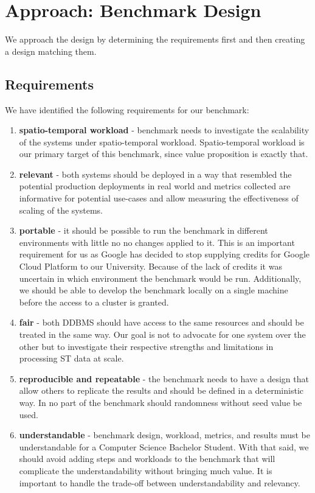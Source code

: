 \section{Approach: Benchmark Design}
\label{cha:benchmarkdesign}

We approach the design by determining the requirements first and then creating a design matching them.

\subsection{Requirements}

We have identified the following requirements for our benchmark:
\begin{enumerate}
	\item \textbf{spatio-temporal workload} \label{req:spatiotemporal-workload}
		- benchmark needs to investigate the scalability of the systems under spatio-temporal workload.
		Spatio-temporal workload is our primary target of this benchmark, since \mobilitydbc value proposition is exactly that.
	\item \textbf{relevant} \label{req:relevant}
		- both systems should be deployed in a way that resembled the potential production deployments in real world and metrics collected are informative for potential use-cases and allow measuring the effectiveness of scaling of the systems.
	\item \textbf{portable} \label{req:portable}
		- it should be possible to run the benchmark in different environments with little no no changes applied to it.
		This is an important requirement for us as Google has decided to stop supplying credits for Google Cloud Platform to our University.
		Because of the lack of credits it was uncertain in which environment the benchmark would be run.
		Additionally, we should be able to develop the benchmark locally on a single machine before the access to a cluster is granted.
	\item \textbf{fair} \label{req:fair}
		- both DDBMS should have access to the same resources and should be treated in the same way.
		Our goal is not to advocate for one system over the other but to investigate their respective strengths and limitations in processing ST data at scale.
	\item \textbf{reproducible and repeatable} \label{req:reproducible-repeatable}
		- the benchmark needs to have a design that allow others to replicate the results and should be defined in a deterministic way.
		In no part of the benchmark should randomness without seed value be used.
	\item \textbf{understandable} \label{req:understandable}
		- benchmark design, workload, metrics, and results must be understandable for a Computer Science Bachelor Student.
		With that said, we should avoid adding steps and workloads to the benchmark that will complicate the understandability without bringing much value.
		It is important to handle the trade-off between understandability and relevancy.
\end{enumerate}

